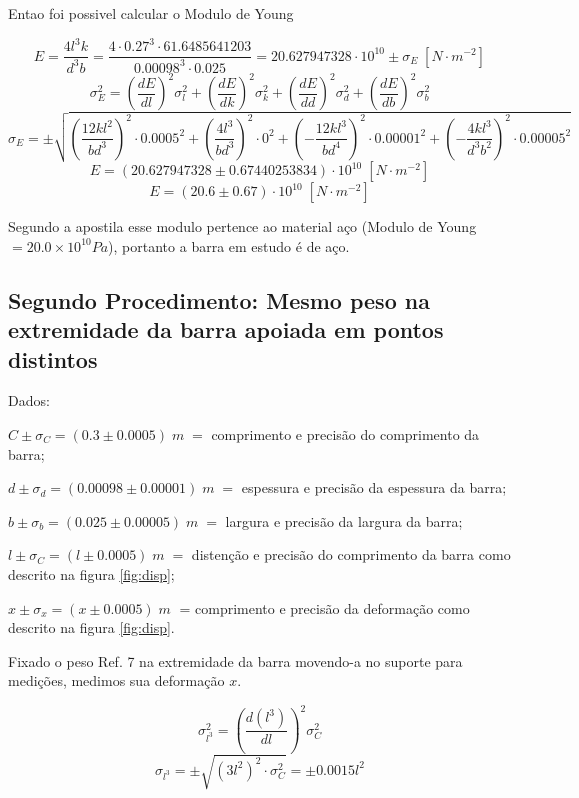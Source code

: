 \documentclass{article}
\begin{document}
Entao foi possivel calcular o Modulo de Young

\[E = \frac{4l^3k}{d^3b} = \frac{4\cdot{0.27}^3\cdot61.6485641203}{{0.00098}^3\cdot0.025} = 20.627947328\cdot{10}^{10}\pm\sigma_E\;\left[N\cdot m^{-2}\right]\]
\[\sigma_E^2 = (\frac{dE}{dl})^2\sigma_l^2 + 
\left(\frac{dE}{dk}\right)^2\sigma_k^2 + 
\left(\frac{dE}{dd}\right)^2\sigma_d^2 + 
\left(\frac{dE}{db}\right)^2\sigma_b^2\]
\[\sigma_E = \pm\sqrt{
\left(\frac{12kl^2}{bd^3}\right)^2\cdot0.0005^2 +
\left(\frac{4l^3}{bd^3}\right)^2\cdot0^2 + 
\left(-\frac{12kl^3}{bd^4}\right)^2\cdot0.00001^2 + 
\left(-\frac{4kl^3}{d^3b^2}\right)^2\cdot0.00005^2
}\]
\[E = \left(20.627947328\pm0.67440253834\right)\cdot{10}^{10}\;\left[N\cdot m^{-2}\right]\]
\[E = \left(20.6\pm0.67\right)\cdot{10}^{10}\;\left[N\cdot m^{-2}\right]\]

Segundo a apostila esse modulo pertence ao material aço (Modulo de Young $= 20.0\times 10^{10} Pa$), portanto a barra em estudo é de aço.


\newpage
\subsection{Segundo Procedimento: Mesmo peso na extremidade da barra apoiada em pontos distintos}

Dados:

$C\pm\sigma_C = (0.3\pm0.0005)\;m\;=$ comprimento e precisão do comprimento da barra;

$d\pm\sigma_d = (0.00098\pm0.00001)\;m\;=$ espessura e precisão da espessura da barra;

$b\pm\sigma_b = (0.025\pm0.00005)\;m\;=$ largura e precisão da largura da barra;

$l\pm\sigma_C = (l\pm0.0005)\;m\;=$ distenção e precisão do comprimento da barra como descrito na figura \ref{fig:disp};

$x\pm\sigma_x = (x\pm0.0005)\;m\;$ = comprimento e precisão da deformação como descrito na figura \ref{fig:disp}.

Fixado o peso Ref. 7 na extremidade da barra movendo-a no suporte para medições, medimos sua deformação $x$.

\[\sigma_{l^{3}}^2 = \left(\frac{d(l^3)}{dl}\right)^2\sigma_C^2\]
\[\sigma_{l^{3}} = \pm\sqrt{\left(3l^2\right)^2\cdot\sigma_C^2} = \pm0.0015l^2\]
\end{document}
